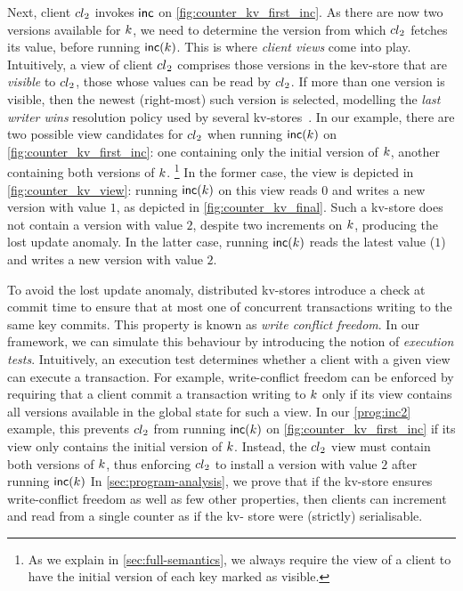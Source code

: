 Next, client ${cl}_2$ invokes $\mathsf{inc}$ on \cref{fig:counter_kv_first_inc}. 
As there are now two versions available for $k$, 
we need to determine the version from which ${cl}_2$ fetches its value, before running $\mathsf{inc}(k)$.
This is where \emph{client views} come into play.
Intuitively, a view of client ${cl}_2$ comprises those versions in the kev-store that are \emph{visible} to ${cl}_2$, 
\ie those whose values can be read by ${cl}_2$. 
If more than one version is visible, then the newest (right-most) such version is selected, 
modelling the \emph{last writer wins} resolution policy used by several kv-stores~\cite{vogels:2009:ec:1435417.1435432}. 
In our example, there are two possible view candidates for ${cl}_2$ when running $\mathsf{inc}(k)$ on \cref{fig:counter_kv_first_inc}: 
one containing only the initial version of $k$, 
another containing both versions of $k$.%
\footnote{
As we explain in \cref{sec:full-semantics}, we always require the view of a client 
to have the initial version of each key marked as visible.}
In the former case, the view is depicted in \cref{fig:counter_kv_view}:
running $\mathsf{inc}(k)$ on this view reads $0$ and writes a new version with value $1$, as depicted in \cref{fig:counter_kv_final}.
Such a kv-store does not contain a version with value $2$, despite two increments on $k$, producing the lost update anomaly.
In the latter case, running $\mathsf{inc}(k)$ reads the latest value ($1$) and writes a new version with value $2$.

To avoid the lost update anomaly, distributed kv-stores introduce a check at commit time to ensure that 
at most one of concurrent transactions writing to the same key commits. 
This property is known as \emph{write conflict freedom}. 
In our framework, we can simulate this behaviour by introducing the notion of \emph{execution tests}. 
Intuitively, an execution test determines whether a client with a given view can execute a transaction. 
For example, write-conflict freedom can be enforced by requiring that a client commit a transaction writing to $k$ 
only if its view contains all versions available in the global state for such a view. 
In our \eqref{prog:inc2} example, this prevents ${cl}_2$ from running $\mathsf{inc}(k)$ on \cref{fig:counter_kv_first_inc}
if its view only contains the initial version of $k$. 
Instead, the ${cl}_2$ view must contain both versions of $k$, 
thus enforcing ${cl}_2$ to install a version with value $2$ after running $\mathsf{inc}(k)$
In \cref{sec:program-analysis}, we prove that if the kv-store 
ensures write-conflict freedom as well as few other properties, then clients can increment 
and read from a single counter as if the kv- store were (strictly) serialisable.

